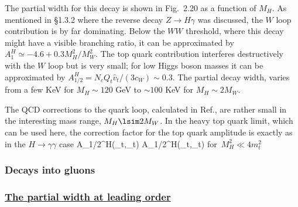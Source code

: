 The partial width for this decay is shown in Fig.~2.20 as a function of
$M_H$. As mentioned in \S1.3.2 where the reverse decay $Z \to H\gamma$ was
discussed, the $W$ loop contribution is by far dominating. Below the $WW$
threshold, where this decay might have a visible branching ratio, it can be
approximated by $A_1^H  \simeq -4.6 + 0.3 M_H^2/M_W^2$. The top quark 
contribution 
interferes destructively with the $W$ loop but is very small; for low Higgs 
boson masses it can be approximated by $A_{1/2}^H= N_c Q_t \hat{v}_t /
(3 c_W) \sim 0.3$. The partial decay width, varies from a few KeV for $M_H \sim
120$ GeV to $\sim 100$ KeV for $M_H \sim 2M_W$. \s

\begin{figure}[!h]
\begin{center}
\vspace*{-2.7cm}
\hspace*{-3cm}
\end{center}
\vspace*{-14.2cm}
\vspace*{-.3cm}
\end{figure}


The QCD corrections to the quark loop, calculated in Ref.\cite{HZpQCD}, are 
rather small in the interesting mass range, $M_H \lsim 2M_W$. In the heavy top 
quark  limit, which can be used here,  the correction factor for the top 
quark amplitude is exactly as in the  $H \to \gamma \gamma$ case
\beq
A_{1/2}^H(\tau_t,\lambda_t)  \to  A_{1/2}^H(\tau_t,\lambda_t) \times {} \hspace*{1cm} \mbox{for $M_H^2\ll 4m_t^2$}
\label{eq:hgagaqcd}
\eeq

\subsubsection{Decays into gluons}

\subsubsection*{\underline{The partial width at leading order}}

